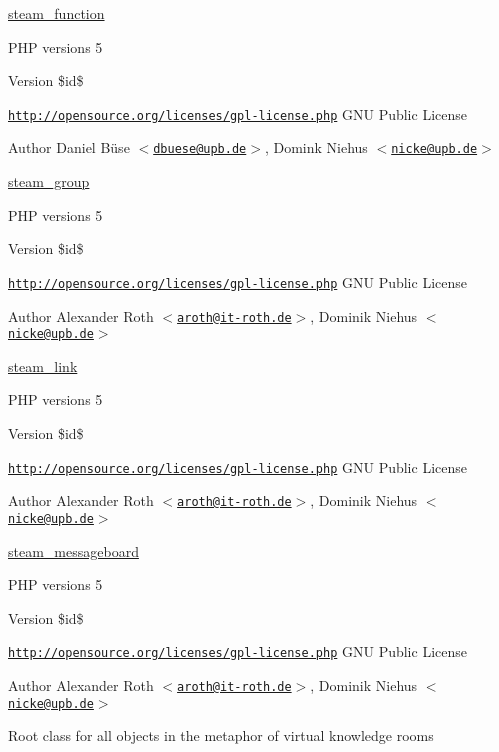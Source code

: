 \hyperlink{classsteam__function}{steam\_\-function}

PHP versions 5

\begin{DoxyVersion}{Version}
\$id\$
\end{DoxyVersion}
\href{http://opensource.org/licenses/gpl-license.php}{\tt http://opensource.org/licenses/gpl-\/license.php} GNU Public License \begin{DoxyAuthor}{Author}
Daniel Büse $<$\href{mailto:dbuese@upb.de}{\tt dbuese@upb.de}$>$, Domink Niehus $<$\href{mailto:nicke@upb.de}{\tt nicke@upb.de}$>$
\end{DoxyAuthor}
\hyperlink{classsteam__group}{steam\_\-group}

PHP versions 5

\begin{DoxyVersion}{Version}
\$id\$
\end{DoxyVersion}
\href{http://opensource.org/licenses/gpl-license.php}{\tt http://opensource.org/licenses/gpl-\/license.php} GNU Public License \begin{DoxyAuthor}{Author}
Alexander Roth $<$\href{mailto:aroth@it-roth.de}{\tt aroth@it-\/roth.de}$>$, Dominik Niehus $<$\href{mailto:nicke@upb.de}{\tt nicke@upb.de}$>$
\end{DoxyAuthor}
\hyperlink{classsteam__link}{steam\_\-link}

PHP versions 5

\begin{DoxyVersion}{Version}
\$id\$
\end{DoxyVersion}
\href{http://opensource.org/licenses/gpl-license.php}{\tt http://opensource.org/licenses/gpl-\/license.php} GNU Public License \begin{DoxyAuthor}{Author}
Alexander Roth $<$\href{mailto:aroth@it-roth.de}{\tt aroth@it-\/roth.de}$>$, Dominik Niehus $<$\href{mailto:nicke@upb.de}{\tt nicke@upb.de}$>$
\end{DoxyAuthor}
\hyperlink{classsteam__messageboard}{steam\_\-messageboard}

PHP versions 5

\begin{DoxyVersion}{Version}
\$id\$
\end{DoxyVersion}
\href{http://opensource.org/licenses/gpl-license.php}{\tt http://opensource.org/licenses/gpl-\/license.php} GNU Public License \begin{DoxyAuthor}{Author}
Alexander Roth $<$\href{mailto:aroth@it-roth.de}{\tt aroth@it-\/roth.de}$>$, Dominik Niehus $<$\href{mailto:nicke@upb.de}{\tt nicke@upb.de}$>$
\end{DoxyAuthor}
Root class for all objects in the metaphor of virtual knowledge rooms

